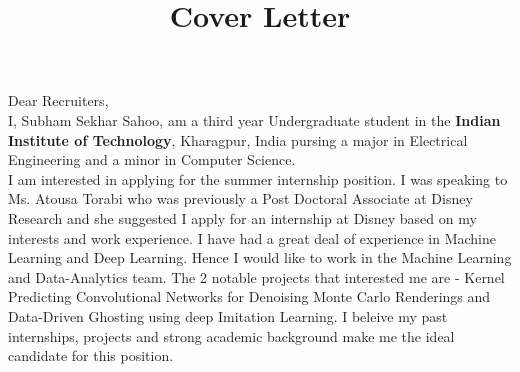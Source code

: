 \title{Cover Letter}
\address{IIT Kharagpur, West Bengal, India}{}
\newcommand\tab[1][1cm]{\hspace*{#1}}


\makecvtitle %

Dear Recruiters, \\

\tab I, Subham Sekhar Sahoo, am a third year Undergraduate student in the \textbf{Indian Institute of Technology}, Kharagpur, India pursing a major in Electrical Engineering and a minor in Computer Science.\\

\tab I am interested in applying for the summer internship position. I was speaking to Ms. Atousa Torabi who was previously a Post Doctoral Associate at Disney Research and she suggested I apply for an internship at Disney based on my interests and work experience. I have had a great deal of experience in Machine Learning and Deep Learning. Hence I would like to work in the Machine Learning and Data-Analytics team. The 2 notable projects that interested me are - Kernel Predicting Convolutional Networks for Denoising Monte Carlo Renderings and Data-Driven Ghosting using deep Imitation Learning. I beleive my past internships, projects and strong academic background make me the ideal candidate for this position. \\

